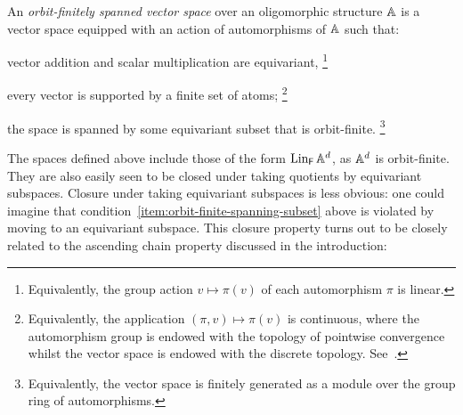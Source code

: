 \begin{definition}\label{def:orbit-finitely-spanned-abstract}
    An \emph{orbit-finitely spanned vector space} over an oligomorphic structure $\mathbb{A}$ is a vector space equipped with an action of automorphisms of $\mathbb{A}$ such that: 
    \begin{bracketenumerate}
        \item
        vector addition and scalar multiplication are equivariant,%
        \footnote{Equivalently, the group action $v \mapsto \pi(v)$ of each automorphism $\pi$ is linear.}

        \item 
        every vector is supported by a finite set of atoms;%
        \footnote{Equivalently, the application $(\pi, v) \mapsto \pi(v)$ is continuous, where the automorphism group is endowed with the topology of pointwise convergence whilst the vector space is endowed with the discrete topology. 
        See~\cite[Lemma~4.1.5]{hodges1993model}.}

        \item \label{item:orbit-finite-spanning-subset} 
        the space is spanned by some equivariant subset that is orbit-finite.%
        \footnote{Equivalently, the vector space is finitely generated as a module over the group ring of automorphisms.}
    \end{bracketenumerate}
\end{definition}

The spaces defined above include those of the form $\operatorname{Lin}_{\mathsf{F}} \mathbb{A}^d$, as $\mathbb{A}^d$ is orbit-finite. 
They are also easily seen to be closed under taking quotients by equivariant subspaces. 
Closure under taking equivariant subspaces is less obvious: 
one could imagine that condition~\eqref{item:orbit-finite-spanning-subset} above is violated by moving to an equivariant subspace. 
This closure property turns out to be closely related to the ascending chain property discussed in the introduction:

